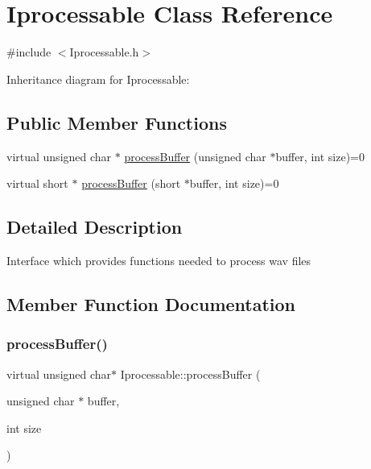 \hypertarget{classIprocessable}{}\section{Iprocessable Class Reference}
\label{classIprocessable}


{\ttfamily \#include $<$Iprocessable.\+h$>$}



Inheritance diagram for Iprocessable\+:
\subsection*{Public Member Functions}
\begin{DoxyCompactItemize}
\item 
virtual unsigned char $\ast$ \hyperlink{classIprocessable_a6f0ff631112fba8eb55d9760b41987ea}{process\+Buffer} (unsigned char $\ast$buffer, int size)=0
\item 
virtual short $\ast$ \hyperlink{classIprocessable_a3a379ff1aab98b507892319afbd7eef0}{process\+Buffer} (short $\ast$buffer, int size)=0
\end{DoxyCompactItemize}


\subsection{Detailed Description}
Interface which provides functions needed to process wav files 

\subsection{Member Function Documentation}
\mbox{\label{classIprocessable_a6f0ff631112fba8eb55d9760b41987ea}} 
\subsubsection{\texorpdfstring{process\+Buffer()}{processBuffer()}\hspace{0.1cm}{\footnotesize\ttfamily [1/2]}}
{\footnotesize\ttfamily virtual unsigned char$\ast$ Iprocessable\+::process\+Buffer (\begin{DoxyParamCaption}\item[{unsigned char $\ast$}]{buffer,  }\item[{int}]{size }\end{DoxyParamCaption})\hspace{0.3cm}{\ttfamily [pure virtual]}}

